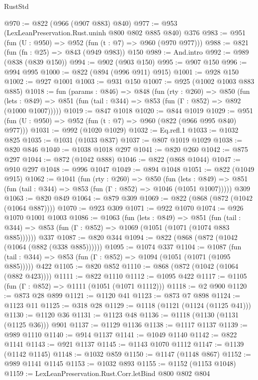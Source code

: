 \begin{lexlean}{RustStd}
\begin{coremodule}
@970 := @822 (@966 (@907 @883) @840)
@977 := @953 (LexLeanPreservation.Rust.uninh @800 @802 @885 @840) @376
@983 := @951 (fun (U : @950) => @952 (fun (t : @7) => @960 (@970 @977)))
@988 := @821 (fun (fn : @25) => @843 (@949 @983)) @150
@989 := And.intro
@992 := @989 (@838 (@839 @150))
@994 := @902 (@903 @150)
@995 := @907 @150
@996 := @994 @995
@1000 := @822 (@894 (@996 @911) @915)
@1001 := @928 @150
@1002 := @927 @1001
@1003 := @931 @150
@1007 := @925 (@1002 @1003 @883 @885)
@1018 := fun (params : @846) =>
  @848
    (fun (rty : @260) =>
    @850
      (fun (lets : @849) =>
      @851 (fun (tail : @344) => @853 (fun (Γ : @852) => @892 (@1000 @1007)))))
@1019 := @847 @1018
@1020 := @844 @1019
@1029 := @951 (fun (U : @950) => @952 (fun (t : @7) => @960 (@822 (@966 @995 @840) @977)))
@1031 := @992 (@1020 @1029)
@1032 := Eq.refl.{1}
@1033 := @1032 @825
@1035 := @1031 (@1033 @837)
@1037 := @807 @1019 @1029
@1038 := @820 @846
@1040 := @1038 @1018 @297
@1041 := @820 @260
@1042 := @875 @297
@1044 := @872 (@1042 @888)
@1046 := @822 (@868 @1044)
@1047 := @910 @297
@1048 := @996 @1047
@1049 := @894 @1048
@1051 := @822 (@1049 @915)
@1062 := @1041
    (fun (rty : @260) =>
    @850
      (fun (lets : @849) =>
      @851 (fun (tail : @344) => @853 (fun (Γ : @852) => @1046 (@1051 @1007)))))
    @309
@1063 := @820 @849
@1064 := @879 @309
@1069 := @822 (@868 (@872 (@1042 (@1064 @887))))
@1070 := @923 @309
@1071 := @922 @1070
@1074 := @926 @1070 @1001 @1003
@1086 := @1063
    (fun (lets : @849) =>
    @851 (fun (tail : @344) => @853 (fun (Γ : @852) => @1069 (@1051 (@1071 (@1074 @883 @885))))))
    @337
@1087 := @820 @344
@1094 := @822 (@868 (@872 (@1042 (@1064 (@882 (@338 @885))))))
@1095 := @1074 @337
@1104 := @1087
    (fun (tail : @344) => @853 (fun (Γ : @852) => @1094 (@1051 (@1071 (@1095 @885)))))
    @422
@1105 := @820 @852
@1110 := @868 (@872 (@1042 (@1064 (@882 @423))))
@1111 := @822 @1110
@1112 := @1095 @422
@1117 := @1105 (fun (Γ : @852) => @1111 (@1051 (@1071 @1112)))
@1118 := @2 @900
@1120 := @873 @28 @899
@1121 := @1120 @41
@1123 := @873 @7 @898
@1124 := @1123 @11
@1125 := @318 @28
@1129 := @1118 (@1121 (@1124 (@1125 @41)))
@1130 := @1120 @36
@1131 := @1123 @48
@1136 := @1118 (@1130 (@1131 (@1125 @36))) @901
@1137 := @1129 @1136
@1138 := @1117 @1137
@1139 := @989 @1110
@1140 := @914 @1137
@1141 := @1049 @1140
@1142 := @822 @1141
@1143 := @921 @1137
@1145 := @1143 @1070 @1112
@1147 := @1139 (@1142 @1145)
@1148 := @1032 @859
@1150 := @1147 (@1148 @867)
@1152 := @989 @1141 @1145
@1153 := @1032 @893
@1155 := @1152 (@1153 @1048)
@1159 := LexLeanPreservation.Rust.Corr.letBind @800 @802 @804

\end{coremodule}
\end{lexlean}
